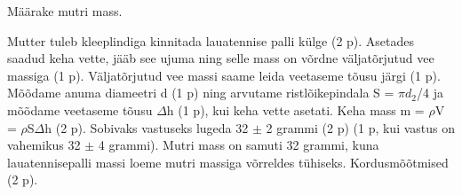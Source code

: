 
Määrake mutri mass.

\hint

\solu
Mutter tuleb kleeplindiga kinnitada lauatennise palli külge (2 p). Asetades saadud keha vette, jääb see ujuma ning selle mass on võrdne väljatõrjutud vee massiga (1 p). Väljatõrjutud vee massi saame leida veetaseme tõusu järgi (1 p). Mõõdame anuma diameetri d (1 p) ning arvutame ristlõikepindala S = $\pi$$d_2$/4 ja mõõdame veetaseme tõusu $\Delta$h (1 p), kui keha vette asetati. Keha mass m = $\rho$V = $\rho$S$\Delta$h (2 p). Sobivaks vastuseks lugeda 32 $\pm$ 2 grammi (2 p) (1 p, kui vastus on vahemikus 32 $\pm$ 4 grammi). Mutri mass on samuti 32 grammi, kuna lauatennisepalli massi loeme mutri massiga võrreldes tühiseks. Kordusmõõtmised (2 p).
\probend
